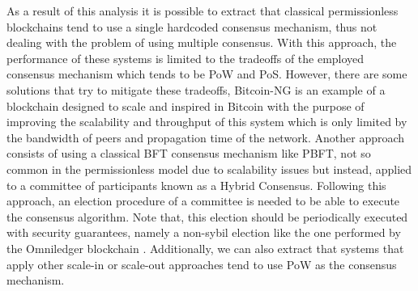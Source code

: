 As a result of this analysis it is possible to extract that classical permissionless blockchains tend to use a single hardcoded consensus mechanism, thus not dealing with the problem of using multiple consensus. With this approach, the performance of these systems is limited to the tradeoffs of the employed consensus mechanism which tends to be \gls{PoW} and \gls{PoS}. However, there are some solutions that try to mitigate these tradeoffs, Bitcoin-NG \cite{bitcoin-ng} is an example of a blockchain designed to scale and inspired in Bitcoin \cite{bitcoin} with the purpose of improving the scalability and throughput of this system which is only limited by the bandwidth of peers and propagation time of the network. Another approach consists of using a classical \gls{BFT} consensus mechanism like \gls{PBFT}, not so common in the permissionless model due to scalability issues but instead, applied to a committee of participants \cite{byzcoin, omniledger} known as a Hybrid Consensus. Following this approach, an election procedure of a committee is needed to be able to execute the consensus algorithm. Note that, this election should be periodically executed with security guarantees, namely a non-sybil election like the one performed by the Omniledger blockchain \cite{omniledger}. Additionally, we can also extract that systems that apply other scale-in or scale-out approaches tend to use \gls{PoW} as the consensus mechanism.



% 
% 
% 
% 
% 
% 

